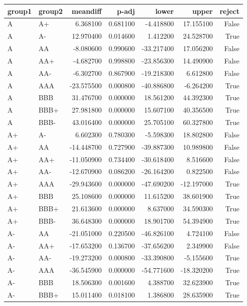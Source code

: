 \begin{tabular}{llrrrrr}
\toprule
group1 & group2 & meandiff & p-adj & lower & upper & reject \\
\midrule
A & A+ & 6.368100 & 0.681100 & -4.418800 & 17.155100 & False \\
A & A- & 12.970400 & 0.014600 & 1.412200 & 24.528700 & True \\
A & AA & -8.080600 & 0.990600 & -33.217400 & 17.056200 & False \\
A & AA+ & -4.682700 & 0.998800 & -23.856300 & 14.490900 & False \\
A & AA- & -6.302700 & 0.867900 & -19.218300 & 6.612800 & False \\
A & AAA & -23.575500 & 0.000800 & -40.886800 & -6.264200 & True \\
A & BBB & 31.476700 & 0.000000 & 18.561200 & 44.392300 & True \\
A & BBB+ & 27.981800 & 0.000000 & 15.607100 & 40.356500 & True \\
A & BBB- & 43.016400 & 0.000000 & 25.705100 & 60.327800 & True \\
A+ & A- & 6.602300 & 0.780300 & -5.598300 & 18.802800 & False \\
A+ & AA & -14.448700 & 0.727900 & -39.887300 & 10.989800 & False \\
A+ & AA+ & -11.050900 & 0.734400 & -30.618400 & 8.516600 & False \\
A+ & AA- & -12.670900 & 0.086200 & -26.164200 & 0.822500 & False \\
A+ & AAA & -29.943600 & 0.000000 & -47.690200 & -12.197000 & True \\
A+ & BBB & 25.108600 & 0.000000 & 11.615200 & 38.601900 & True \\
A+ & BBB+ & 21.613600 & 0.000000 & 8.637000 & 34.590300 & True \\
A+ & BBB- & 36.648300 & 0.000000 & 18.901700 & 54.394900 & True \\
A- & AA & -21.051000 & 0.220500 & -46.826100 & 4.724100 & False \\
A- & AA+ & -17.653200 & 0.136700 & -37.656200 & 2.349900 & False \\
A- & AA- & -19.273200 & 0.000800 & -33.390800 & -5.155600 & True \\
A- & AAA & -36.545900 & 0.000000 & -54.771600 & -18.320200 & True \\
A- & BBB & 18.506300 & 0.001600 & 4.388700 & 32.623900 & True \\
A- & BBB+ & 15.011400 & 0.018100 & 1.386800 & 28.635900 & True \\

\end{tabular}
